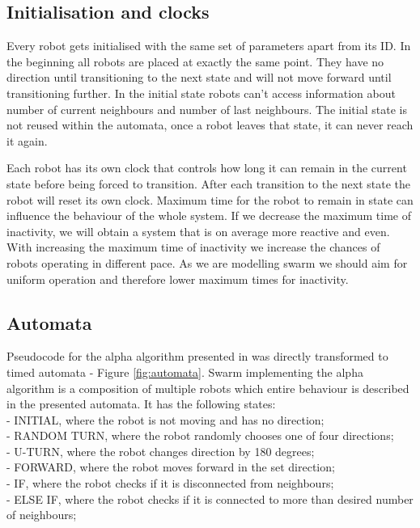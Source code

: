 \documentclass{article}
\begin{document}
\subsection{Initialisation and clocks}
Every robot gets initialised with the same set of parameters apart from its ID. In the beginning all robots are placed at exactly the same point. They have no direction until transitioning to the next state and will not move forward until transitioning further. In the initial state robots can't access information about number of current neighbours and number of last neighbours. The initial state is not reused within the automata, once a robot leaves that state, it can never reach it again.

Each robot has its own clock that controls how long it can remain in the current state before being forced to transition. After each transition to the next state the robot will reset its own clock. Maximum time for the robot to remain in state can influence the behaviour of the whole system. If we decrease the maximum time of inactivity, we will obtain a system that is on average more reactive and even. With increasing the maximum time of inactivity we increase the chances of robots operating in different pace. As we are modelling swarm we should aim for uniform operation and therefore lower maximum times for inactivity.

\subsection{Automata}
Pseudocode for the alpha algorithm presented in \cite{Minimalist_Coherent_Swarming_of_Wireless_Networked_Autonomous_Mobile_Robots} was directly transformed to timed automata - Figure \ref{fig:automata}. Swarm implementing the alpha algorithm is a composition of multiple robots which entire behaviour is described in the presented automata. It has the following states:\\
- INITIAL, where the robot is not moving and has no direction;\\
- RANDOM TURN, where the robot randomly chooses one of four directions;\\
- U-TURN, where the robot changes direction by 180 degrees;\\
- FORWARD, where the robot moves forward in the set direction;\\
- IF, where the robot checks if it is disconnected from neighbours;\\
- ELSE IF, where the robot checks if it is connected to more than desired number of neighbours;
\end{document}
